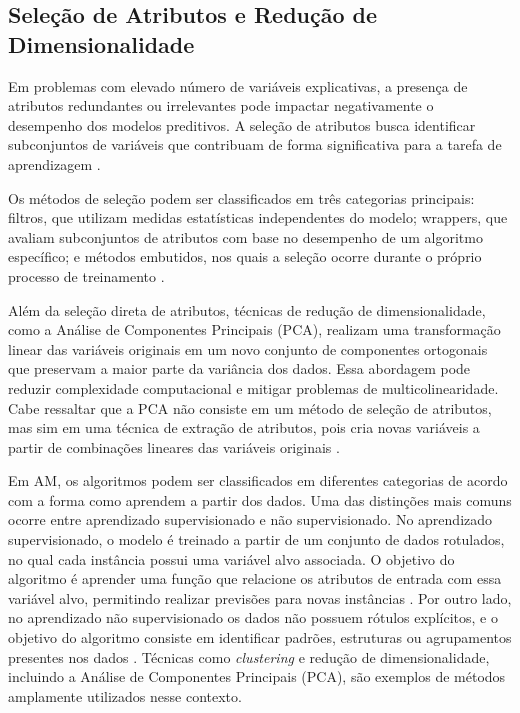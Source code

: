 \subsection{Seleção de Atributos e Redução de Dimensionalidade}

Em problemas com elevado número de variáveis explicativas, a presença de atributos redundantes ou irrelevantes pode impactar negativamente 
o desempenho dos modelos preditivos. A seleção de atributos busca identificar subconjuntos de variáveis que contribuam de forma significativa para 
a tarefa de aprendizagem \cite{Liu2010}.

Os métodos de seleção podem ser classificados em três categorias principais: filtros, que utilizam medidas estatísticas independentes do modelo; 
wrappers, que avaliam subconjuntos de atributos com base no desempenho de um algoritmo específico; e métodos embutidos, nos quais a seleção ocorre 
durante o próprio processo de treinamento \cite{Guyon2006}.

Além da seleção direta de atributos, técnicas de redução de dimensionalidade, como a Análise de Componentes Principais (PCA), 
realizam uma transformação linear das variáveis originais em um novo conjunto de componentes ortogonais que preservam a maior parte da variância dos dados. 
Essa abordagem pode reduzir complexidade computacional e mitigar problemas de multicolinearidade. Cabe ressaltar que a PCA não consiste em um método 
de seleção de atributos, mas sim em uma técnica de extração de atributos, pois cria novas variáveis a partir de combinações lineares das variáveis originais \cite{Guyon2006}.

Em AM, os algoritmos podem ser classificados em diferentes categorias de acordo com a forma como aprendem a partir dos dados. 
Uma das distinções mais comuns ocorre entre aprendizado supervisionado e não supervisionado. 
No aprendizado supervisionado, o modelo é treinado a partir de um conjunto de dados rotulados, no qual cada instância possui uma variável alvo associada. 
O objetivo do algoritmo é aprender uma função que relacione os atributos de entrada com essa variável alvo, permitindo realizar previsões para novas instâncias \cite{Geron2019}. 
Por outro lado, no aprendizado não supervisionado os dados não possuem rótulos explícitos, e o objetivo do algoritmo consiste em identificar padrões, estruturas ou agrupamentos 
presentes nos dados \cite{Geron2019}. Técnicas como \textit{clustering} e redução de dimensionalidade, incluindo a Análise de Componentes Principais (PCA), 
são exemplos de métodos amplamente utilizados nesse contexto.

